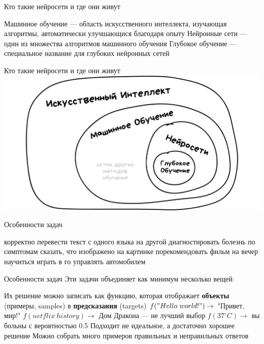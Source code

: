 \documentclass[aspectratio=169, professionalfonts]{beamer}
\begin{document}
\begin{frame}{Кто такие нейросети и где они живут}
    \begin{outline}
        \1 Машинное обучение --- область искусственного интеллекта, изучающая алгоритмы,
        автоматически улучшающися благодаря опыту
        \1 Нейронные сети --- один из множества алгоритмов машинного обучения
        \1 Глубокое обучение --- специальное название для глубоких нейронных сетей
    \end{outline}

\end{frame}

\begin{frame}{Кто такие нейросети и где они живут}
    \centering
    \includegraphics[width=.9\linewidth]{graphs/fig5.jpg}
\end{frame}

\begin{frame}{Особенности задач}
    \begin{outline}
        \1 корректно перевести текст с одного языка на другой
        \1 диагностировать болезнь по симптомам
        \1 сказать, что изображено на картинке
        \1 порекомендовать фильм на вечер
        \1 научиться играть в го
        \1 управлять автомобилем
    \end{outline}
\end{frame}

\begin{frame}{Особенности задач}
    Эти задачи объединяет как минимум несколько вещей:
    \begin{outline}
        \1 Их решение можно записать как функцию, которая отображает \textbf{объекты}
        (примеры, samples) в \textbf{предсказания} (targets)
            \2 \( f("Hello \ world!") \to \) "Привет, мир!"
            \2 \( f(netflix \ history) \to \) Дом Дракона --- не лучший выбор
            \2 \( f(37^\circ C) \to \) вы больны с вероятностью 0.5
        \pause
        \1 Подходит не идеальное, а достаточно хорошее решение
        \pause
        \1 Можно собрать много примеров правильных и неправильных ответов
    \end{outline}
\end{frame}
\end{document}
